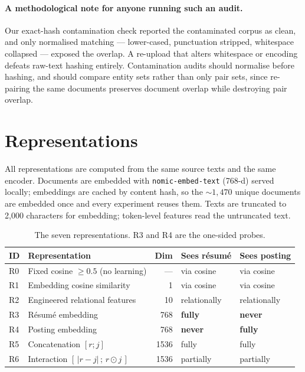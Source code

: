 \documentclass[11pt]{article}                      %
\newcommand{\tabfont}{\footnotesize}
\begin{document}
\paragraph{A methodological note for anyone running such an audit.}
Our exact-hash contamination check reported the contaminated corpus as clean, and
only normalised matching --- lower-cased, punctuation stripped, whitespace
collapsed --- exposed the overlap. A re-upload that alters whitespace or encoding
defeats raw-text hashing entirely. Contamination audits should normalise before
hashing, and should compare entity sets rather than only pair sets, since
re-pairing the same documents preserves document overlap while destroying pair
overlap.

\section{Representations}

All representations are computed from the same source texts and the same encoder.
Documents are embedded with \texttt{nomic-embed-text} (768-d) served locally;
embeddings are cached by content hash, so the ${\sim}1{,}470$ unique documents are
embedded once and every experiment reuses them. Texts are truncated to 2{,}000
characters for embedding; token-level features read the untruncated text.

\begin{table}[t]
\centering\tabfont
\caption{The seven representations. R3 and R4 are the one-sided probes.}
\label{tab:reps}
\begin{tabular}{llrll}
\toprule
ID & Representation & Dim & Sees résumé & Sees posting \\
\midrule
R0 & Fixed cosine $\geq 0.5$ (no learning) & --- & via cosine & via cosine \\
R1 & Embedding cosine similarity & 1 & via cosine & via cosine \\
R2 & Engineered relational features & 10 & relationally & relationally \\
R3 & Résumé embedding & 768 & \textbf{fully} & \textbf{never} \\
R4 & Posting embedding & 768 & \textbf{never} & \textbf{fully} \\
R5 & Concatenation $[r ; j]$ & 1536 & fully & fully \\
R6 & Interaction $[\,|r-j|\,;\,r \odot j\,]$ & 1536 & partially & partially \\
\bottomrule
\end{tabular}
\end{table}
\end{document}
